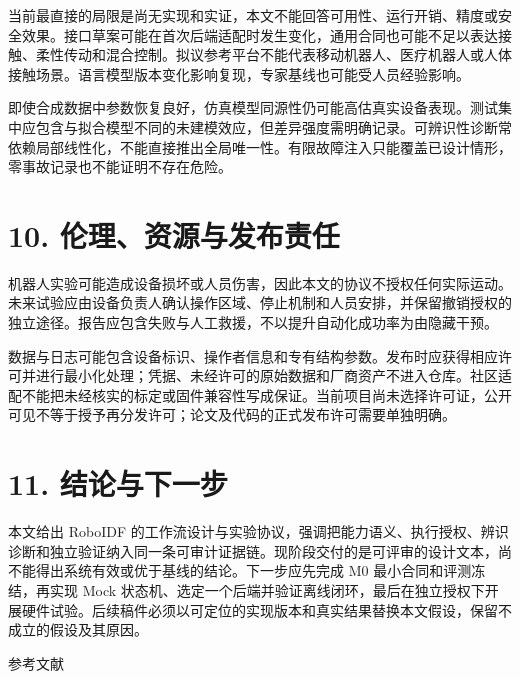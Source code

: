 \documentclass[
  chinese,
  11pt,
  a4paper,
  fontset=fandol]{ctexart}
\begin{document}
当前最直接的局限是尚无实现和实证，本文不能回答可用性、运行开销、精度或安全效果。接口草案可能在首次后端适配时发生变化，通用合同也可能不足以表达接触、柔性传动和混合控制。拟议参考平台不能代表移动机器人、医疗机器人或人体接触场景。语言模型版本变化影响复现，专家基线也可能受人员经验影响。

即使合成数据中参数恢复良好，仿真模型同源性仍可能高估真实设备表现。测试集中应包含与拟合模型不同的未建模效应，但差异强度需明确记录。可辨识性诊断常依赖局部线性化，不能直接推出全局唯一性。有限故障注入只能覆盖已设计情形，零事故记录也不能证明不存在危险。

\section{10.
伦理、资源与发布责任}\label{ux4f26ux7406ux8d44ux6e90ux4e0eux53d1ux5e03ux8d23ux4efb}

机器人实验可能造成设备损坏或人员伤害，因此本文的协议不授权任何实际运动。未来试验应由设备负责人确认操作区域、停止机制和人员安排，并保留撤销授权的独立途径。报告应包含失败与人工救援，不以提升自动化成功率为由隐藏干预。

数据与日志可能包含设备标识、操作者信息和专有结构参数。发布时应获得相应许可并进行最小化处理；凭据、未经许可的原始数据和厂商资产不进入仓库。社区适配不能把未经核实的标定或固件兼容性写成保证。当前项目尚未选择许可证，公开可见不等于授予再分发许可；论文及代码的正式发布许可需要单独明确。

\section{11. 结论与下一步}\label{ux7ed3ux8bbaux4e0eux4e0bux4e00ux6b65}

本文给出 RoboIDF
的工作流设计与实验协议，强调把能力语义、执行授权、辨识诊断和独立验证纳入同一条可审计证据链。现阶段交付的是可评审的设计文本，尚不能得出系统有效或优于基线的结论。下一步应先完成
M0 最小合同和评测冻结，再实现 Mock
状态机、选定一个后端并验证离线闭环，最后在独立授权下开展硬件试验。后续稿件必须以可定位的实现版本和真实结果替换本文假设，保留不成立的假设及其原因。

参考文献
\end{document}
